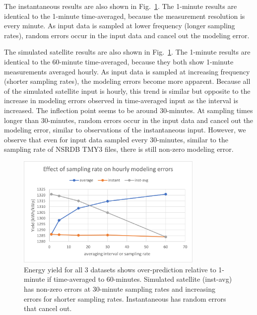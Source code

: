 \documentclass[conference]{IEEEtran}
\begin{document}
The instantaneous results are also shown in Fig.~\ref{fig:NIST-energy-yield}. The 1-minute results are identical to the 1-minute time-averaged, because the measurement resolution is every minute. As input data is sampled at lower frequency (longer sampling rates), random errors occur in the input data and cancel out the modeling error.

The simulated satellite results are also shown in Fig.~\ref{fig:NIST-energy-yield}. The 1-minute results are identical to the 60-minute time-averaged, because they both show 1-minute measurements averaged hourly. As input data is sampled at increasing frequency (shorter sampling rates), the modeling errors become more apparent. Because all of the simulated satellite input is hourly, this trend is similar but opposite to the increase in modeling errors observed in time-averaged input as the interval is increased. The inflection point seems to be around 30-minutes. At sampling times longer than 30-minutes, random errors occur in the input data and cancel out the modeling error, similar to observations of the instantaneous input. However, we observe that even for input data sampled every 30-minutes, similar to the sampling rate of NSRDB TMY3 files, there is still non-zero modeling error.

\begin{figure}[htbp]
\centerline{\includegraphics[width=9cm]{NIST_energy_yield.png}}
\caption{Energy yield for all 3 datasets shows over-prediction relative to 1-minute if time-averaged to 60-minutes. Simulated satellite (inst-avg) has non-zero errors at 30-minute sampling rates and increasing errors for shorter sampling rates. Instantaneous has random errors that cancel out.}
\label{fig:NIST-energy-yield}
\end{figure}
\end{document}
